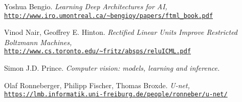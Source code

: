 \begin{thebibliography}{9}
Yoshua Bengio. \textit{Learning Deep Architectures for AI,}
\\\texttt{\url{http://www.iro.umontreal.ca/~bengioy/papers/ftml_book.pdf}}

Vinod Nair, Geoffrey E. Hinton. \textit{Rectified Linear Units Improve Restricted Boltzmann Machines,}
\\\texttt{\url{http://www.cs.toronto.edu/~fritz/absps/reluICML.pdf}}

Simon J.D. Prince. \textit{Computer vision: models, learning and inference.}

Olaf  Ronneberger,  Philipp  Fischer, Thomas  Broxde. \textit{U-net,}
\\\texttt{\url{https://lmb.informatik.uni-freiburg.de/people/ronneber/u-net/}}

\end{thebibliography}
